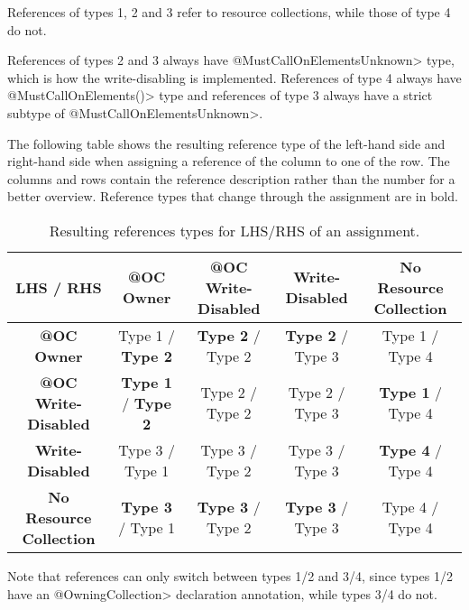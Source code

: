 \noindent References of types 1, 2 and 3 refer to resource collections, while those of type 4 do not.

\noindent References of types 2 and 3 always have \<@MustCallOnElementsUnknown> type, which is how the write-disabling is implemented. References of type 4 always have \<@MustCallOnElements({})> type and references of type 3 always have a strict subtype of \<@MustCallOnElementsUnknown>.

The following table shows the resulting reference type of the left-hand side and right-hand side when assigning a reference of the column to one of the row. The columns and rows contain the reference description rather than the number for a better overview. Reference types that change through the assignment are in bold.

\begin{table}[ht]
    \centering
    \caption{Resulting references types for LHS/RHS of an assignment.}
    \begin{tabular}{|c|c|c|c|c|}
        \hline
        \textbf{LHS / RHS} & \textbf{@OC Owner} & \textbf{@OC Write-Disabled} & \textbf{Write-Disabled} & \textbf{No Resource Collection} \\ \hline
        \textbf{@OC Owner} & Type 1 / \textbf{Type 2} & \textbf{Type 2} / Type 2 & \textbf{Type 2} / Type 3 & Type 1 / Type 4 \\ \hline
        \textbf{@OC Write-Disabled} & \textbf{Type 1} / \textbf{Type 2} & Type 2 / Type 2 & Type 2 / Type 3 & \textbf{Type 1} / Type 4 \\ \hline
        \textbf{Write-Disabled} & Type 3 / Type 1 & Type 3 / Type 2 & Type 3 / Type 3 & \textbf{Type 4} / Type 4 \\ \hline
        \textbf{No Resource Collection} & \textbf{Type 3} / Type 1 & \textbf{Type 3} / Type 2 & \textbf{Type 3} / Type 3  & Type 4 / Type 4 \\ \hline
    \end{tabular}
    \label{tab:abstract_domain_results_with_errors}
\end{table}

Note that references can only switch between types 1/2 and 3/4, since types 1/2 have an \<@OwningCollection> declaration annotation, while types 3/4 do not.

